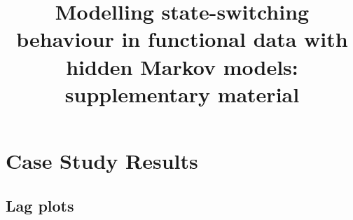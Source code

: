 \documentclass{article}
\begin{document}



\title{Modelling state-switching behaviour in functional data with hidden Markov models: supplementary material}%


\maketitle

\addtocounter{tablenum}{1}
\addtocounter{fignum}{1}

\section{Case Study Results}

    \subsection{Lag plots}
        
\end{document}
